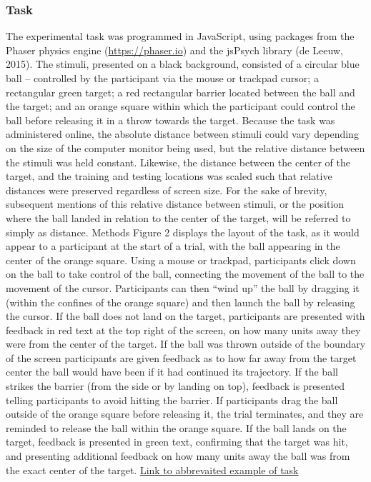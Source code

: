 \documentclass[
  jou, donotrepeattitle,floatsintext]{apa7}
\begin{document}
\hypertarget{task}{%
\subsubsection{Task}\label{task}}

The experimental task was programmed in JavaScript, using packages from the Phaser physics engine (\url{https://phaser.io}) and the jsPsych library (de Leeuw, 2015). The stimuli, presented on a black background, consisted of a circular blue ball -- controlled by the participant via the mouse or trackpad cursor; a rectangular green target; a red rectangular barrier located between the ball and the target; and an orange square within which the participant could control the ball before releasing it in a throw towards the target. Because the task was administered online, the absolute distance between stimuli could vary depending on the size of the computer monitor being used, but the relative distance between the stimuli was held constant. Likewise, the distance between the center of the target, and the training and testing locations was scaled such that relative distances were preserved regardless of screen size. For the sake of brevity, subsequent mentions of this relative distance between stimuli, or the position where the ball landed in relation to the center of the target, will be referred to simply as distance. Methods Figure 2 displays the layout of the task, as it would appear to a participant at the start of a trial, with the ball appearing in the center of the orange square.
Using a mouse or trackpad, participants click down on the ball to take control of the ball, connecting the movement of the ball to the movement of the cursor. Participants can then ``wind up'' the ball by dragging it (within the confines of the orange square) and then launch the ball by releasing the cursor. If the ball does not land on the target, participants are presented with feedback in red text at the top right of the screen, on how many units away they were from the center of the target. If the ball was thrown outside of the boundary of the screen participants are given feedback as to how far away from the target center the ball would have been if it had continued its trajectory. If the ball strikes the barrier (from the side or by landing on top), feedback is presented telling participants to avoid hitting the barrier. If participants drag the ball outside of the orange square before releasing it, the trial terminates, and they are reminded to release the ball within the orange square. If the ball lands on the target, feedback is presented in green text, confirming that the target was hit, and presenting additional feedback on how many units away the ball was from the exact center of the target.
\href{https://pcl.sitehost.iu.edu/tg/demos/igas_expt1_demo.html}{Link to abbrevaited example of task}
\end{document}
